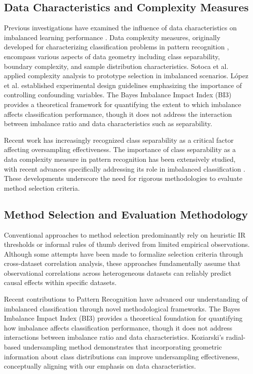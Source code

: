 \documentclass[12pt,a4paper]{article}
\theoremstyle{definition}
\begin{document}
\subsection{Data Characteristics and Complexity Measures}
\indent Previous investigations have examined the influence of data characteristics on imbalanced learning performance \cite{prati2009data,luengo2015addressing}. Data complexity measures, originally developed for characterizing classification problems in pattern recognition \cite{ho2002complexity}, encompass various aspects of data geometry including class separability, boundary complexity, and sample distribution characteristics. Sotoca et al. \cite{sotoca2005data} applied complexity analysis to prototype selection in imbalanced scenarios. L{\'o}pez et al. \cite{lopez2013insight} established experimental design guidelines emphasizing the importance of controlling confounding variables. The Bayes Imbalance Impact Index (BI3) \cite{pr2019bayesian} provides a theoretical framework for quantifying the extent to which imbalance affects classification performance, though it does not address the interaction between imbalance ratio and data characteristics such as separability.

Recent work has increasingly recognized class separability as a critical factor affecting oversampling effectiveness. The importance of class separability as a data complexity measure in pattern recognition has been extensively studied, with recent advances specifically addressing its role in imbalanced classification \cite{pr2019bayesian,pr2020radial}. These developments underscore the need for rigorous methodologies to evaluate method selection criteria.

\subsection{Method Selection and Evaluation Methodology}
\indent Conventional approaches to method selection predominantly rely on heuristic IR thresholds or informal rules of thumb derived from limited empirical observations. Although some attempts have been made to formalize selection criteria through cross-dataset correlation analysis, these approaches fundamentally assume that observational correlations across heterogeneous datasets can reliably predict causal effects within specific datasets.

Recent contributions to Pattern Recognition have advanced our understanding of imbalanced classification through novel methodological frameworks. The Bayes Imbalance Impact Index (BI3) \cite{pr2019bayesian} provides a theoretical foundation for quantifying how imbalance affects classification performance, though it does not address interactions between imbalance ratio and data characteristics. Koziarski's radial-based undersampling method \cite{pr2020radial} demonstrates that incorporating geometric information about class distributions can improve undersampling effectiveness, conceptually aligning with our emphasis on data characteristics. 
\end{document}
